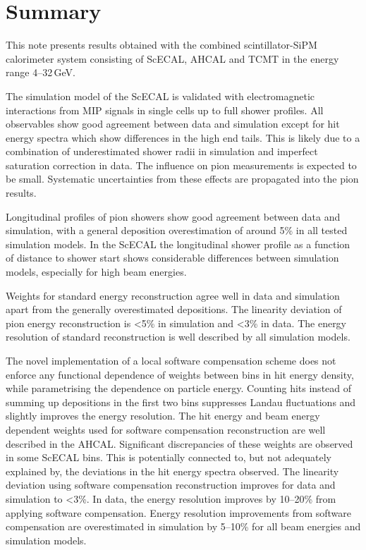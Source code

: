 \documentclass[twoside,a4paper,12pt]{article}
\begin{document}
\section{Summary}
This note presents results obtained with the combined scintillator-SiPM calorimeter system consisting of ScECAL, AHCAL and TCMT in the energy range 4--32\,GeV.

The simulation model of the ScECAL is validated with electromagnetic interactions from MIP signals in single cells up to full shower profiles. All observables show good agreement between data and simulation except for hit energy spectra which show differences in the high end tails. This is likely due to a combination of underestimated shower radii in simulation and imperfect saturation correction in data. The influence on pion measurements is expected to be small. Systematic uncertainties from these effects are propagated into the pion results.

Longitudinal profiles of pion showers show good agreement between data and simulation, with a general deposition overestimation of around 5\% in all tested simulation models. In the ScECAL the longitudinal shower profile as a function of distance to shower start shows considerable differences between simulation models, especially for high beam energies. 

Weights for standard energy reconstruction agree well in data and simulation apart from the generally overestimated depositions. The linearity deviation of pion energy reconstruction is \textless5\% in simulation and \textless3\% in data. The energy resolution of standard reconstruction is well described by all simulation models. 

The novel implementation of a local software compensation scheme does not enforce any functional dependence of weights between bins in hit energy density, while parametrising the dependence on particle energy. Counting hits instead of summing up depositions in the first two bins suppresses Landau fluctuations and slightly improves the energy resolution. The hit energy and beam energy dependent weights used for software compensation reconstruction are well described in the AHCAL. Significant discrepancies of these weights are observed in some ScECAL bins. This is potentially connected to, but not adequately explained by, the deviations in the hit energy spectra observed. The linearity deviation using software compensation reconstruction improves for data and simulation to \textless3\%. In data, the energy resolution improves by 10--20\% from applying software compensation. Energy resolution improvements from software compensation are overestimated in simulation by 5--10\% for all beam energies and simulation models.
\end{document}

